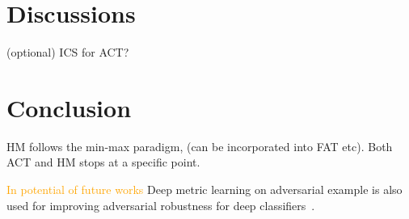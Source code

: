 \documentclass[10pt,twocolumn,letterpaper]{article}
\newcommand{\oo}[1]{\textcolor{orange}{#1}}
\begin{document}
\section{Discussions}
\label{sec:5}

(optional) ICS for ACT?

\section{Conclusion}
\label{sec:6}

HM follows the min-max paradigm, (can be incorporated into FAT etc).
Both ACT and HM stops at a specific point.

\oo{In potential of future works}
Deep metric learning on adversarial example is also used for improving
adversarial robustness for deep classifiers~\cite{mao2019metric}.

{\small


}


\end{document}
